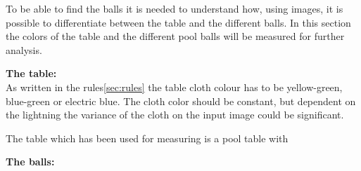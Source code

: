 To be able to find the balls it is needed to understand how, using images, it is possible to differentiate between the table and the different balls. In this section the colors of the table and the different pool balls will be measured for further analysis.

\textbf{The table:}\\
As written in the rules\ref{sec:rules} the table cloth colour has to be yellow-green, blue-green or electric blue. The cloth color should be constant, but dependent on the lightning the variance of the cloth on the input image could be significant.

The table which has been used for measuring is a pool table with 




\textbf{The balls:}\\